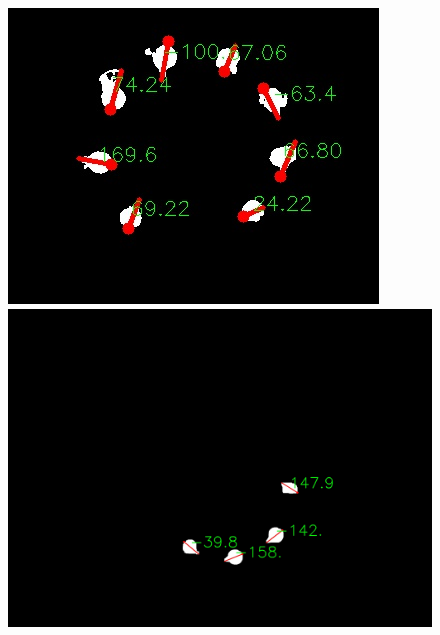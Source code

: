 \documentclass[a4paper]{ctexart}
\begin{document}
\begin{figure}[htbp]
	\centering
	\begin{minipage}[t]{0.25\textwidth}
		\centering
		\includegraphics[width=\textwidth]{figure/point_to/img1.jpg}
	\end{minipage}
	\begin{minipage}[t]{0.25\textwidth}
		\centering
		\includegraphics[width=\textwidth]{figure/point_to/img2.jpg}
	\end{minipage}\\
	\begin{minipage}[t]{0.25\textwidth}
		\centering

\end{minipage}
\end{figure}
\end{document}
